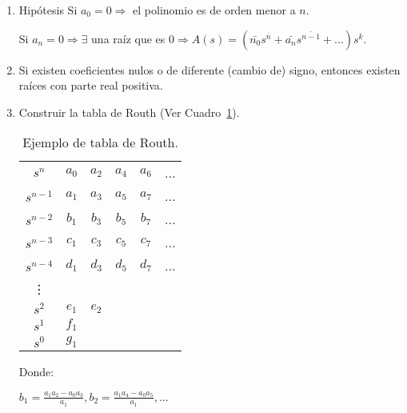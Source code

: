         \begin{enumerate}
            \item Hipótesis
                Si \begin{math}a_0 = 0 \Rightarrow\end{math} el polinomio es de orden menor a \begin{math}n\end{math}.

                Si \begin{math}a_n = 0 \Rightarrow \exists\end{math} una raíz que es \begin{math}0 \Rightarrow A(s) = (\bar{n_0} s^{\bar{n}} + \bar{a_n} s^{\bar{n-1}} + ...) s^k \end{math}.

            \item Si existen coeficientes nulos o de diferente (cambio de) signo, entonces existen raíces con parte real positiva.\newpage
            \item Construir la tabla de Routh (Ver Cuadro~\ref{tab:Routh}).

            \begin{table}[htbp]
                \centering
                \begin{tabular}{c|c c c c c}
                    $s^n$     & $a_0$ & $a_2$ & $a_4$ & $a_6$ & ...\\
                    $s^{n-1}$ & $a_1$ & $a_3$ & $a_5$ & $a_7$ & ...\\
                    $s^{n-2}$ & $b_1$ & $b_3$ & $b_5$ & $b_7$ & ...\\
                    $s^{n-3}$ & $c_1$ & $c_3$ & $c_5$ & $c_7$ & ...\\
                    $s^{n-4}$ & $d_1$ & $d_3$ & $d_5$ & $d_7$ & ...\\
                    \vdots                                         \\
                    $s^2$ & $e_1$ & $e_2$                          \\
                    $s^1$ & $f_1$                                  \\
                    $s^0$ & $g_1$
                \end{tabular}
                \caption{\label{tab:Routh}Ejemplo de tabla de Routh.}
            \end{table}

            Donde:

            \begin{math}
            b_1 = \frac{a_1 a_2 - a_0 a_3}{a_1} , b_2 = \frac{a_1 a_4 - a_0 a_5}{a_1} , \dots
            \end{math}


\end{enumerate}
